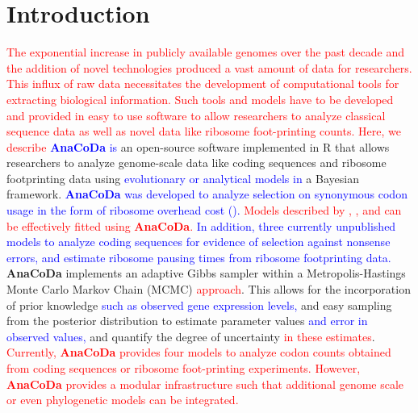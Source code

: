 \documentclass{bioinfo}
\newcommand{\package}{\textbf{AnaCoDa}\xspace} %
\begin{document}
\section*{Introduction}

\textcolor{red}
{
The exponential increase in publicly available genomes over the past decade and the addition of novel technologies produced a vast amount of data for researchers.  
This influx of raw data necessitates the development of computational tools for extracting biological information. 
Such tools and models have to be developed and provided in easy to use software to allow researchers to analyze classical sequence data as well as novel data like ribosome foot-printing counts.
Here, we describe
} %
\textcolor{blue}{\package is}  an open-source software implemented in R \citep{rcore} that allows researchers to analyze genome-scale data like coding sequences and ribosome footprinting data using \textcolor{blue}{evolutionary or analytical models in} a Bayesian framework. 
\textcolor{blue}{\package was developed to analyze selection on synonymous codon usage in the form of ribosome overhead cost (\citet{gilchrist2015,wallace2013,shah2011}).} \textcolor{red}{Models described by \citet{gilchrist2015}, \citet{wallace2013}, and \citet{shah2011} can be effectively fitted using \package.}
\textcolor{blue} 
{
In addition, three currently unpublished models to analyze coding sequences for evidence of selection against nonsense errors, and estimate ribosome pausing times from ribosome footprinting data.
} %
\package implements an adaptive Gibbs sampler within a Metropolis-Hastings Monte Carlo Markov Chain (MCMC) \textcolor{red}{approach}. 
This allows for the incorporation of prior knowledge \textcolor{blue}{such as observed gene expression levels,} and easy sampling from the posterior distribution to estimate parameter values \textcolor{blue}{and error in observed values,} and quantify the degree of uncertainty \textcolor{red}{in these estimates}.
\textcolor{red}
{
Currently, \package provides four models to analyze codon counts obtained from coding sequences or ribosome foot-printing experiments. 
However, \package provides a modular infrastructure such that additional genome scale or even phylogenetic models can be integrated.
} 
\end{document}
